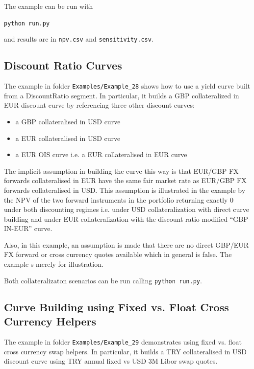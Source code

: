 \documentclass[12pt, a4paper]{article}
\begin{document}
{The example can be run with

\medskip
\centerline{\tt python run.py}

\medskip
and results are in {\tt npv.csv} and {\tt sensitivity.csv}.

\subsection{Discount Ratio Curves}%
\label{example:28}

The example in folder {\tt Examples/Example\_28} shows how to use a yield curve 
built from a DiscountRatio segment. 
In particular, it builds a GBP collateralized in EUR discount curve by referencing 
three other discount curves:
\begin{itemize}
\item a GBP collateralised in USD curve
\item a EUR collateralised in USD curve
\item a EUR OIS curve i.e. a EUR collateralised in EUR curve
\end{itemize}

The implicit assumption in building the curve this way is that EUR/GBP FX 
forwards collateralised in EUR have the same fair market rate as EUR/GBP 
FX forwards collateralised in USD. This assumption is illustrated in the 
example by the NPV of the two forward instruments in the portfolio returning 
exactly 0 under both discounting regimes i.e. under USD collateralization with 
direct curve building and under EUR collateralization with the discount ratio 
modified ``GBP-IN-EUR'' curve.

Also, in this example, an assumption is made that there are no direct GBP/EUR FX 
forward or cross currency quotes available which in general is false. The example 
s merely for illustration.

Both collateralizaton scenarios can be run calling {\tt python run.py}.

\subsection{Curve Building using Fixed vs. Float Cross Currency Helpers}%
\label{example:29}

The example in folder {\tt Examples/Example\_29} demonstrates using fixed vs. float 
cross currency swap helpers. In particular, it builds a TRY collateralised in USD 
discount curve using TRY annual fixed vs USD 3M Libor swap quotes.

}
\end{document}
